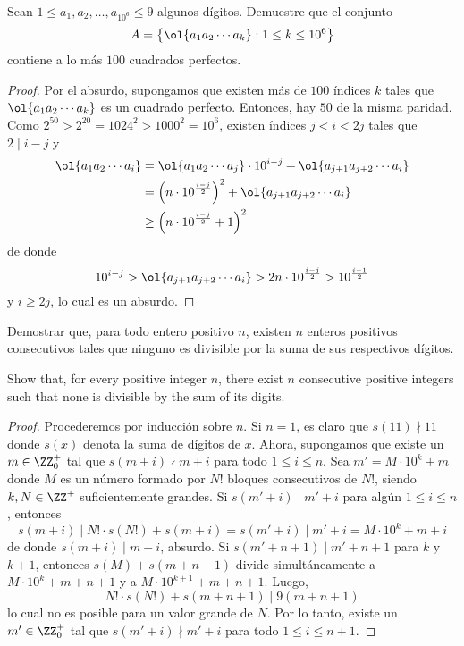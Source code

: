 
\begin{probEG}
  Sean $1\le a_1,a_2,\dots,a_{10^6}\le 9$ algunos dígitos. Demuestre que el conjunto
  \[A=\left\{\ol{a_1a_2\cdots a_k}:1\le k\le 10^6\right\}\]
  contiene a lo más $100$ cuadrados perfectos.
\end{probEG}

\begin{proof}
  Por el absurdo, supongamos que existen más de $100$ índices $k$ tales que
  $\ol{a_1a_2\cdots a_k}$ es un cuadrado perfecto. Entonces, hay $50$ de la
  misma paridad. Como $2^{50}>2^{20}=1024^2>1000^2=10^6$, existen índices
  $j<i<2j$ tales que $2\mid i-j$ y
  \begin{align*}
    \ol{a_1a_2\cdots a_i}
    &= \ol{a_1a_2\cdots a_j}\cdot 10^{i-j}+\ol{a_{j+1}a_{j+2}\cdots a_i} \\
    &= \left(n\cdot 10^\frac{i-j}{2}\right)^2+\ol{a_{j+1}a_{j+2}\cdots a_i} \\
    &\ge \left(n\cdot 10^\frac{i-j}{2}+1\right)^2
  \end{align*}
  de donde
  \[
    10^{i-j}
    >\ol{a_{j+1}a_{j+2}\cdots a_i}
    >2n\cdot 10^\frac{i-j}{2}
    >10^\frac{i-1}{2}
  \]
  y $i\ge 2j$, lo cual es un absurdo.
\end{proof}


\begin{probMG}[IberoAmerican 2012/6]
  Demostrar que, para todo entero positivo $n$, existen $n$ enteros positivos
  consecutivos tales que ninguno es divisible por la suma de sus respectivos
  dígitos.
  \begin{hint}
    Show that, for every positive integer $n$, there exist $n$ consecutive
    positive integers such that none is divisible by the sum of its digits.
  \end{hint}
\end{probMG}

\begin{proof}
  Procederemos por inducción sobre $n$. Si $n=1$, es claro que $s(11)\nmid 11$
  donde $s(x)$ denota la suma de dígitos de $x$. Ahora, supongamos que existe un
  $m\in\ZZ^+_0$ tal que $s(m+i)\nmid m+i$ para todo $1\le i\le n$. Sea
  $m'=M\cdot 10^k+m$ donde $M$ es un número formado por $N!$ bloques
  consecutivos de $N!$, siendo $k,N\in\ZZ^+$ suficientemente grandes. Si
  $s(m'+i)\mid m'+i$ para algún $1\le i\le n$, entonces
  \[s(m+i)\mid N!\cdot s(N!)+s(m+i)=s(m'+i)\mid m'+i=M\cdot 10^k+m+i\]
  de donde $s(m+i)\mid m+i$, absurdo. Si $s(m'+n+1)\mid m'+n+1$ para $k$ y
  $k+1$, entonces $s(M)+s(m+n+1)$ divide simultáneamente a $M\cdot 10^k+m+n+1$ y
  a $M\cdot 10^{k+1}+m+n+1$. Luego,
  \[N!\cdot s(N!)+s(m+n+1)\mid 9(m+n+1)\]
  lo cual no es posible para un valor grande de $N$. Por lo tanto, existe un
  $m'\in\ZZ^+_0$ tal que $s(m'+i)\nmid m'+i$ para todo $1\le i\le n+1$.
\end{proof}

